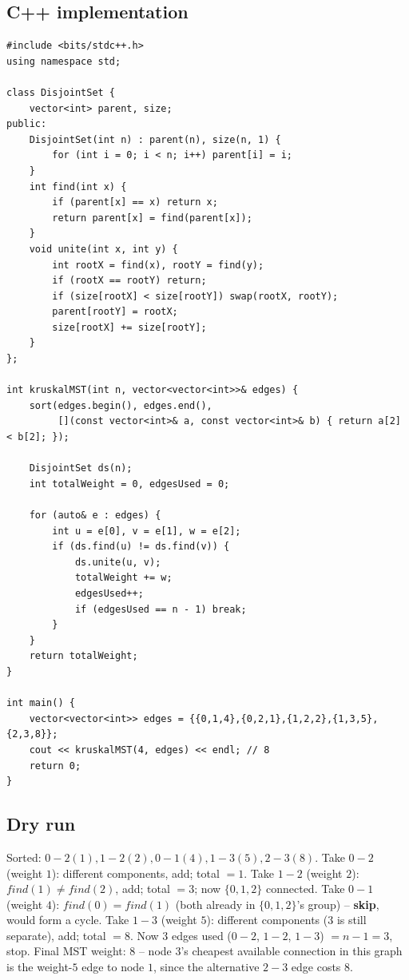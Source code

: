 \subsection*{C++ implementation}

\begin{lstlisting}
#include <bits/stdc++.h>
using namespace std;

class DisjointSet {
    vector<int> parent, size;
public:
    DisjointSet(int n) : parent(n), size(n, 1) {
        for (int i = 0; i < n; i++) parent[i] = i;
    }
    int find(int x) {
        if (parent[x] == x) return x;
        return parent[x] = find(parent[x]);
    }
    void unite(int x, int y) {
        int rootX = find(x), rootY = find(y);
        if (rootX == rootY) return;
        if (size[rootX] < size[rootY]) swap(rootX, rootY);
        parent[rootY] = rootX;
        size[rootX] += size[rootY];
    }
};

int kruskalMST(int n, vector<vector<int>>& edges) {
    sort(edges.begin(), edges.end(),
         [](const vector<int>& a, const vector<int>& b) { return a[2] < b[2]; });

    DisjointSet ds(n);
    int totalWeight = 0, edgesUsed = 0;

    for (auto& e : edges) {
        int u = e[0], v = e[1], w = e[2];
        if (ds.find(u) != ds.find(v)) {
            ds.unite(u, v);
            totalWeight += w;
            edgesUsed++;
            if (edgesUsed == n - 1) break;
        }
    }
    return totalWeight;
}

int main() {
    vector<vector<int>> edges = {{0,1,4},{0,2,1},{1,2,2},{1,3,5},{2,3,8}};
    cout << kruskalMST(4, edges) << endl; // 8
    return 0;
}
\end{lstlisting}

\subsection*{Dry run}


Sorted: $0{-}2(1),1{-}2(2),0{-}1(4),1{-}3(5),2{-}3(8)$. Take $0{-}2$
(weight $1$): different components, add; total $=1$. Take $1{-}2$
(weight $2$): $\textit{find}(1) \neq \textit{find}(2)$, add; total
$=3$; now $\{0,1,2\}$ connected. Take $0{-}1$ (weight $4$):
$\textit{find}(0)=\textit{find}(1)$ (both already in $\{0,1,2\}$'s
group) -- \textbf{skip}, would form a cycle. Take $1{-}3$ (weight
$5$): different components ($3$ is still separate), add; total
$=8$. Now $3$ edges used ($0{-}2$, $1{-}2$, $1{-}3$) $=n{-}1=3$, stop.
Final MST weight: $8$ -- node $3$'s cheapest available connection in
this graph is the weight-$5$ edge to node $1$, since the alternative
$2{-}3$ edge costs $8$.

